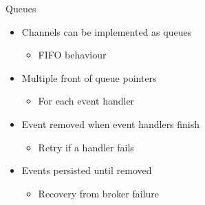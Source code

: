 \documentclass{slide}
\begin{document}
\begin{frame}{Queues}
    \vspace{1mm}
    {\LARGE
    \begin{itemize}
        \item Channels can be implemented as queues
        \begin{itemize}
            \Large\item FIFO behaviour
	\end{itemize}
        \vspace{3mm}
        \item Multiple front of queue pointers
        \begin{itemize}
            \Large\item For each event handler
	\end{itemize}
        \vspace{3mm}
        \item Event removed when event handlers finish
        \begin{itemize}
            \Large\item Retry if a handler fails
	\end{itemize}
        \vspace{3mm}
        \item Events persisted until removed
        \begin{itemize}
            \Large\item Recovery from broker failure
	\end{itemize}
    \end{itemize}
    }
\end{frame}
\end{document}
